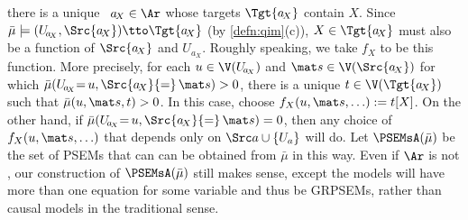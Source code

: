 {    there is a unique
    \arc\ $a_{\!X} \in \Ar$ whose targets $\Tgt {a_{\!X}}$ contain $X$.
Since
$\bar\mu \models ( U_{\!a_{\!X}}, \Src{a_{\!X}}) \tto \Tgt {a_{\!X}}$
(by \cref{defn:qim}(c)),
$X \in \Tgt {a_{\!X}}$ must also be 
a function of $\Src{a_{\!X}}$ and $U_{\!a_{\!X}}$.
Roughly speaking, we take $f_X$ to be this function. 
More precisely,
for each $u \in \V (U_{\!a_{\!X}})$ and $\mat s \in \V (\Src {a_{\!X}})$
for which $\bar\mu(U_{\!a_{\!X}} {=}\, u, \Src {a_{\!X}} {=}\, \mat s) > 0$,
there is a unique
 $t \in \V (\Tgt {a_{\!X}})$ such that $\bar\mu(u,\mat s, t) > 0$.
In this case, choose $f_X(u, \mat s, \ldots) := t[X]$.
On the other hand, if $\bar\mu(U_{\!a_{\!X}} {=}\, u, \Src {a_{\!X}} {=}\, \mat s) = 0$,
then any choice of $f_X(u, \mat s, \ldots)$ that depends only on $\Src a \cup \{U_a\}$ will do.
Let 
$\PSEMsA(\bar\mu)$
be the set of PSEMs that can can be obtained from $\bar\mu$
    in this way.
Even if $\Ar$ is not \subpartl, our construction of $\PSEMsA(\bar\mu)$ still makes sense, except the models will have more than one equation for some variable and thus be GRPSEMs, rather than causal models in the traditional sense. 
}

